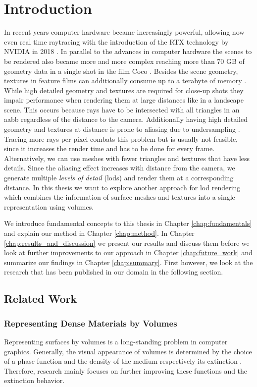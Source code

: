 \chapter{Introduction}
\label{chap:intro}

In recent years computer hardware became increasingly powerful, allowing now even real time raytracing with the introduction of the RTX technology by NVIDIA in 2018 \cite{turing_whitepaper}.
In parallel to the advances in computer hardware the scenes to be rendered also became more and more complex reaching more than 70 GB of geometry data in a single shot in the film Coco \cite{pixarxpu}.
Besides the scene geometry, textures in feature films can additionally consume up to a terabyte of memory \cite{arnold}.
While high detailed geometry and textures are required for close-up shots they impair performance when rendering them at large distances like in a landscape scene.
This occurs because rays have to be intersected with all triangles in an \ac{aabb} regardless of the distance to the camera.
Additionally having high detailed geometry and textures at distance is prone to aliasing due to undersampling \cite{pbr}.
Tracing more rays per pixel combats this problem but is usually not feasible, since it increases the render time and has to be done for every frame.
Alternatively, we can use meshes with fewer triangles and textures that have less details.
Since the aliasing effect increases with distance from the camera, we generate multiple \textit{levels of detail} (\acsp{lod}) and render them at a corresponding distance.
In this thesis we want to explore another approach for \acl{lod} rendering which combines the information of surface meshes and textures into a single representation using volumes.

We introduce fundamental concepts to this thesis in Chapter \ref{chap:fundamentals} and explain our method in Chapter \ref{chap:method}.
In Chapter \ref{chap:results_and_discussion} we present our results and discuss them before we look at further improvements to our approach in Chapter \ref{chap:future_work} and summarize our findings in Chapter \ref{chap:summary}.
First however, we look at the research that has been published in our domain in the following section.

\section{Related Work}
\subsection{Representing Dense Materials by Volumes}
Representing surfaces by volumes is a long-standing problem in computer graphics.
Generally, the visual appearance of volumes is determined by the choice of a phase function and the density of the medium respectively its extinction \cite{pbr}.
Therefore, research mainly focuses on further improving these functions and the extinction behavior.

